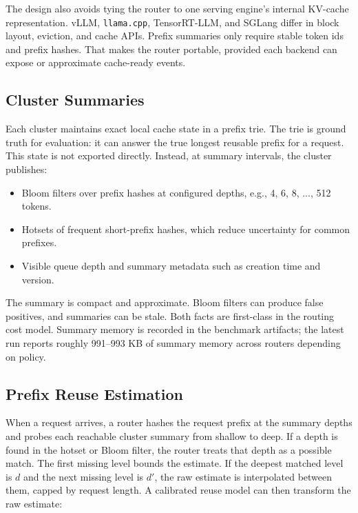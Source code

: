 \documentclass[10pt,twocolumn]{article}
\begin{document}
The design also avoids tying the router to one serving engine's internal KV-cache representation. vLLM, \texttt{llama.cpp}, TensorRT-LLM, and SGLang differ in block layout, eviction, and cache APIs. Prefix summaries only require stable token ids and prefix hashes. That makes the router portable, provided each backend can expose or approximate cache-ready events.

\subsection{Cluster Summaries}

Each cluster maintains exact local cache state in a prefix trie. The trie is ground truth for evaluation: it can answer the true longest reusable prefix for a request. This state is not exported directly. Instead, at summary intervals, the cluster publishes:

\begin{itemize}[leftmargin=*]
\item Bloom filters over prefix hashes at configured depths, e.g., 4, 6, 8, ..., 512 tokens.
\item Hotsets of frequent short-prefix hashes, which reduce uncertainty for common prefixes.
\item Visible queue depth and summary metadata such as creation time and version.
\end{itemize}

The summary is compact and approximate. Bloom filters can produce false positives, and summaries can be stale. Both facts are first-class in the routing cost model. Summary memory is recorded in the benchmark artifacts; the latest run reports roughly 991--993 KB of summary memory across routers depending on policy.

\subsection{Prefix Reuse Estimation}

When a request arrives, a router hashes the request prefix at the summary depths and probes each reachable cluster summary from shallow to deep. If a depth is found in the hotset or Bloom filter, the router treats that depth as a possible match. The first missing level bounds the estimate. If the deepest matched level is $d$ and the next missing level is $d'$, the raw estimate is interpolated between them, capped by request length. A calibrated reuse model can then transform the raw estimate:
\end{document}
